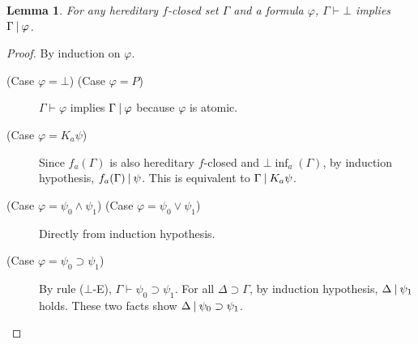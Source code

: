 \documentclass[doctor]{iscs-thesis}
\newtheorem{lemma}{Lemma}
\begin{document}
\begin{lemma}
 \label{absurd}
 For any hereditary $f$-closed set 
 $\Gamma$ and a formula $\varphi$,
 $\Gamma\vdash\bot$ implies $\Gamma\mathbin{\mid}\varphi$.
\end{lemma}
\begin{proof}
 By induction on $\varphi$.
 \begin{description}
  \item[ (Case $\varphi =\bot$) (Case $\varphi =P$)]
	     $\Gamma\vdash\varphi$ implies $\Gamma\mathbin{\mid}\varphi$ because $\varphi$ is
	     atomic.
  \item[ (Case $\varphi = K_a\psi$)]
	     Since $f_a(\Gamma)$ is also hereditary $f$-closed and $\bot\inf_a(\Gamma)$,
	     by induction hypothesis, $f_a(\Gamma)\mathbin{\mid}\psi$.
	     This is equivalent to $\Gamma\mathbin{\mid} K_a\psi$.
  \item[ (Case $\varphi = \psi_0\wedge\psi_1$) (Case $\varphi = \psi_0\vee\psi_1$)]
	     Directly from induction hypothesis.
  \item[ (Case $\varphi = \psi_0\supset\psi_1$)]
	     By rule ($\bot$-E), $\Gamma\vdash\psi_0\supset\psi_1$.
	     For all $\Delta\supset\Gamma$, by induction hypothesis,
	     $\Delta\mathbin{\mid}\psi_1$ holds.
	     These two facts show $\Delta\mathbin{\mid}\psi_0\supset\psi_1$.
 \end{description}
\end{proof}
\end{document}
